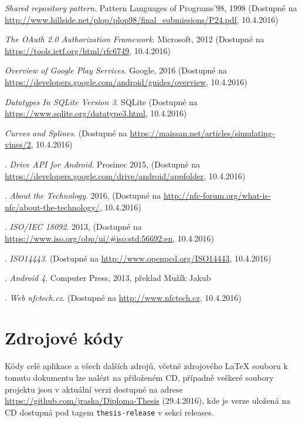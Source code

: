 \documentclass[czech,master,public,dept460,male,java,cpdeclaration]{diploma}
\begin{document}
\begin{thebibliography}{99}
\textit{Shared repository pattern}. {Pattern Languages of Programs'98, 1998}
\newline(Dostupné na \url{http://www.hillside.net/plop/plop98/final_submissions/P24.pdf}, 10.4.2016)

\textit{The OAuth 2.0 Authorization Framework}. {Microsoft, 2012
\newline(Dostupné na \url{https://tools.ietf.org/html/rfc6749}, 10.4.2016)}

\textit{Overview of Google Play Services}. {Google, 2016
\newline(Dostupné na \url{https://developers.google.com/android/guides/overview}, 10.4.2016)}

\textit{Datatypes In SQLite Version 3}. {SQLite
\newline(Dostupné na \url{https://www.sqlite.org/datatype3.html}, 10.4.2016)}


\textit{Curves and Splines}.
\newline(Dostupné na \url{https://maissan.net/articles/simulating-vines/2}, 10.4.2016)



.
\textit{Drive API for Android}. {Prosinec 2015,
\newline(Dostupné na \url{https://developers.google.com/drive/android/appfolder}, 10.4.2016)}

.
\textit{About the Technology}. {2016,
\newline(Dostupné na \url{http://nfc-forum.org/what-is-nfc/about-the-technology/}, 10.4.2016)}

.
\textit{ISO/IEC 18092}. {2013,
\newline(Dostupné na \url{https://www.iso.org/obp/ui/#iso:std:56692:en}, 10.4.2016)}


.
\textit{ISO14443}. {
\newline(Dostupné na \url{http://www.openpcd.org/ISO14443}, 10.4.2016)}

.
\textit{Android 4}. {Computer Press, 2013, překlad Mužík Jakub}

.
\textit{Web nfctech.cz}. {
\newline(Dostupné na \url{http://www.nfctech.cz}, 10.4.2016)}

\end{thebibliography}

  \appendix

  \section{Zdrojové kódy}
  Kódy celé aplikace a všech dalších zdrojů, včetně zdrojového \mbox{\LaTeX}
  souboru k tomuto dokumentu
   lze nalézt na přiloženém CD, případně veškeré soubory
  projektu jsou v aktuální verzi dostupné na adrese \url{https://github.com/jraska/Diploma-Thesis} (29.4.2016),
  kde je verze uložená na CD dostupná pod tagem \texttt{thesis-release} v sekci releases.
\end{document}
